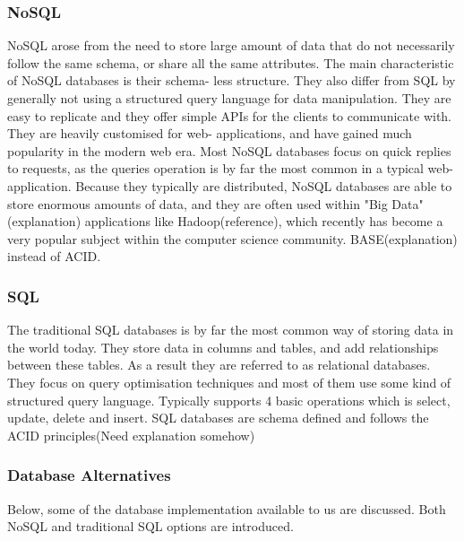 \subsubsection*{NoSQL}
NoSQL arose from the need to store large amount of data that do not necessarily follow the same schema, or share all the same attributes. The main characteristic of NoSQL databases is their schema- less structure. They also differ from SQL by generally not using a structured query language for data manipulation. They are easy to replicate and they offer simple APIs for the clients to communicate with. They are heavily customised for web- applications, and have gained much popularity in the modern web era. Most NoSQL databases focus on quick replies to requests, as the queries operation is by far the most common in a typical web- application. Because they typically are distributed, NoSQL databases are able to store enormous amounts of data, and they are often used within "Big Data"(explanation) applications like Hadoop(reference), which recently has become a very popular subject within the computer science community. BASE(explanation) instead of ACID. 


\subsubsection*{SQL}
The traditional SQL databases is by far the most common way of storing data in the world today. They store data in columns and tables, and add relationships between these tables. As a result they are referred to as relational databases. They focus on query optimisation techniques and most of them use some kind of structured query language. Typically supports 4 basic operations which is select, update, delete and insert. SQL databases are schema defined and follows the ACID principles(Need explanation somehow)
\newline

\subsubsection{Database Alternatives}
Below, some of the database implementation available to us are discussed. Both NoSQL and traditional SQL options are introduced.

